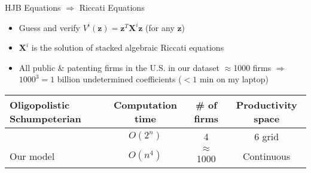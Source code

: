 \documentclass[
  10pt,               %
  aspectratio=169,     %
]{beamer}
\theoremstyle{plain}
\begin{document}
%
\begin{frame}{HJB Equations $\Longrightarrow$ Riccati Equations}

  \label{hjb}
  \begin{itemize}
    \item Guess and verify $V^{i}\left(\bm{z}\right)=\bm{z}^{T}\bm{X}^{i}\bm{z}$
          (for any $\bm{z}$) \medskip{}
    \item $\bm{X}^{i}$ is the solution of stacked algebraic Riccati equations

          \hyperlink{riccati}{}\medskip{}\pause
    \item All public \& patenting firms in the U.S. in our dataset $\approx$1000
          firms $\Longrightarrow$ \\
          $1000^{3}=1$ billion undetermined coefficients ($< 1$ min on my laptop)\medskip{}
  \end{itemize}
  \begin{center}
    \begin{tabular}{@{}p{5cm}ccc@{}}
      \toprule
      Oligopolistic Schumpeterian & Computation time & \# of firms   & Productivity space \\
      \midrule
      \citet{Cavenaile2023-lo}    & $O(2^n)$         & 4             & 6 grid             \\
      Our model                   & $O(n^4)$         & $\approx$1000 & Continuous         \\
      \bottomrule
    \end{tabular}
  \end{center}

\end{frame}
%
\end{document}
